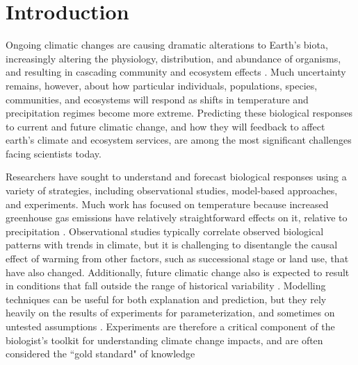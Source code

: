 \documentclass{article}
\begin{document}
\section* {Introduction}
\par Ongoing climatic changes are causing dramatic alterations to Earth's biota, increasingly altering the physiology, distribution, and abundance of organisms, and resulting in cascading community and ecosystem effects \citep{shukla1982,cox2000,thomas2004,parmesan2006,field2007,sheldon2011,urban2012}.  Much uncertainty remains, however, about how particular individuals, populations, species, communities, and ecosystems will respond as shifts in temperature and precipitation regimes become more extreme. Predicting these biological responses to current and future climatic change, and how they will feedback to affect earth's climate and ecosystem services, are among the most significant challenges facing scientists today.%
\par Researchers have sought to understand and forecast biological responses using a variety of strategies, including observational studies, model-based approaches, and experiments. Much work has focused on temperature because increased greenhouse gas emissions have relatively straightforward effects on it, relative to precipitation \citep{ipcc2013}. Observational studies typically correlate observed biological patterns with trends in climate, but it is challenging to disentangle the causal effect of warming from other factors, such as successional stage or land use, that have also changed. Additionally, future climatic change also is expected to result in conditions that fall outside the range of historical variability \citep{ohlemuller2006,williams2007,williams2007b,ipcc2013}.%
Modelling techniques can be useful for both explanation and prediction, but they rely heavily on the results of experiments for parameterization, and sometimes on untested assumptions \citep [i.e.,][]{pearson2004,ibanez2006,swab2012}.  Experiments are therefore a critical component of the biologist's toolkit for understanding climate change impacts, and are often considered the ``gold standard" of knowledge%
\end{document}
